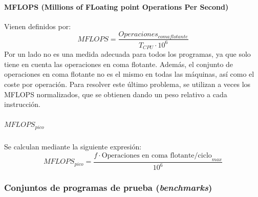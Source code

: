 \documentclass[12pt,spanish]{article}
\begin{document}
\paragraph{MFLOPS (Millions of FLoating point Operations Per Second)}
Vienen definidos por:
\begin{equation}
MFLOPS=\frac{Operaciones_{coma flotante}}{T_{CPU} \cdot 10^6}
\end{equation}
Por un lado no es una medida adecuada para todos los programas, ya que solo tiene en cuenta las operaciones en coma flotante. Además, el conjunto de operaciones en coma flotante no es el mismo en todas las máquinas, así como el coste por operación. Para resolver este último problema, se utilizan a veces los MFLOPS normalizados, que se obtienen dando un peso relativo a cada instrucción.
\subparagraph{\boldmath $MFLOPS_{pico}$}
Se calculan mediante la siguiente expresión:
\begin{equation}
MFLOPS_{pico}=\frac{f \cdot \text{Operaciones en coma flotante/ciclo}_{max}}{10^6}
\end{equation}
\subsubsection{Conjuntos de programas de prueba (\textit{benchmarks})}
\end{document}
